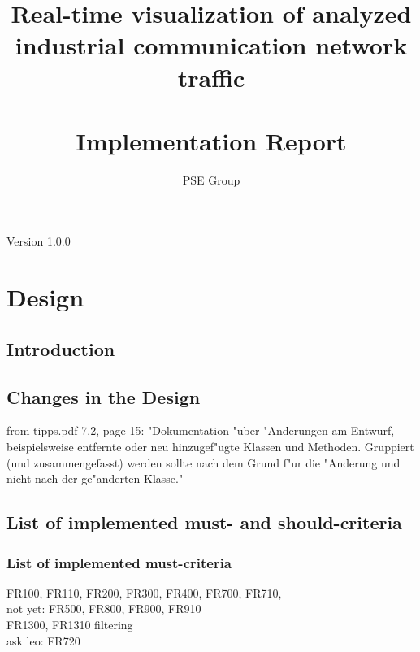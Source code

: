 \documentclass[oneside, english, final]{design}
\author{PSE Group}
\title{Real-time visualization of analyzed industrial communication network traffic\\ \hfill \\Implementation Report}
\begin{document}
\nocite{*}

\setpdf

\maketitle


\hfill

\begin{center}
	\large{Version 1.0.0}
\end{center}


\thispagestyle{empty}
\begin{abstract}
	\thispagestyle{empty}
\end{abstract}

\thispagestyle{empty}
\newpage
\thispagestyle{empty}
\tableofcontents
\cleardoublepage
\setcounter{page}{1}


\section{Design}\label{sec:intro}
\subsection{Introduction}
\subsection{Changes in the Design}
from tipps.pdf 7.2, page 15:
"Dokumentation "uber "Anderungen am Entwurf, beispielsweise entfernte oder neu hinzugef"ugte 
Klassen und Methoden. Gruppiert (und zusammengefasst) werden sollte nach dem Grund f"ur
die "Anderung und nicht nach der ge"anderten Klasse."

\subsection{List of implemented must- and should-criteria}
\subsubsection{List of implemented must-criteria}
FR100, FR110, FR200, FR300, FR400, FR700, FR710,
\\
not yet: FR500, FR800, FR900, FR910 \\
FR1300, FR1310 filtering\\
ask leo: FR720
\end{document}
